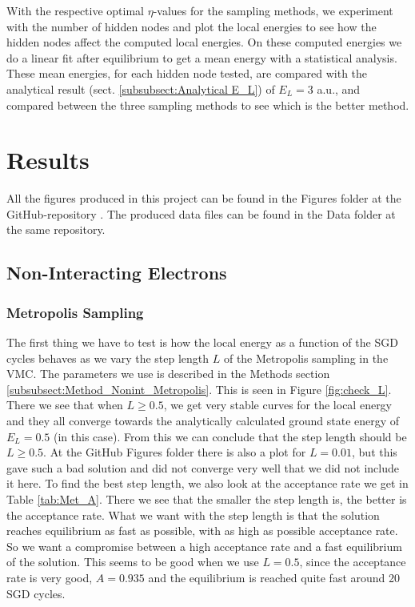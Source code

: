 \documentclass[12pt,a4paper,english]{article}
\begin{document}
With the respective optimal $\eta$-values for the sampling methods, we experiment with the number of hidden nodes and plot the local energies to see how the hidden nodes affect the computed local energies. On these computed energies we do a linear fit after equilibrium to get a mean energy with a statistical analysis. These mean energies, for each hidden node tested, are compared with the analytical result (sect. \ref{subsubsect:Analytical E_L}) of $E_L=3$ a.u., and compared between the three sampling methods to see which is the better method.


\section{Results}
\label{sect:Results}
All the figures produced in this project can be found in the Figures folder at the GitHub-repository \cite{GitHub}. The produced data files can be found in the Data folder at the same repository.
\subsection{Non-Interacting Electrons}
\label{subsect:Results_nonint}
\subsubsection{Metropolis Sampling}
\label{subsubsect:Results_nonint_Metropolis}
The first thing we have to test is how the local energy as a function of the SGD cycles behaves as we vary the step length $L$ of the Metropolis sampling in the VMC. The parameters we use is described in the Methods section \ref{subsubsect:Method_Nonint_Metropolis}. This is seen in Figure \ref{fig:check_L}. There we see that when $L\geq0.5$, we get very stable curves for the local energy and they all converge towards the analytically calculated ground state energy of $E_L=0.5$ (in this case). From this we can conclude that the step length should be $L\geq0.5$. At the GitHub Figures folder there is also a plot for $L=0.01$, but this gave such a bad solution and did not converge very well that we did not include it here. To find the best step length, we also look at the acceptance rate we get in Table \ref{tab:Met_A}. There we see that the smaller the step length is, the better is the acceptance rate. What we want with the step length is that the solution reaches equilibrium as fast as possible, with as high as possible acceptance rate. So we want a compromise between a high acceptance rate and a fast equilibrium of the solution. This seems to be good when we use $L=0.5$, since the acceptance rate is very good, $A=0.935$ and the equilibrium is reached quite fast around 20 SGD cycles.
\end{document}
